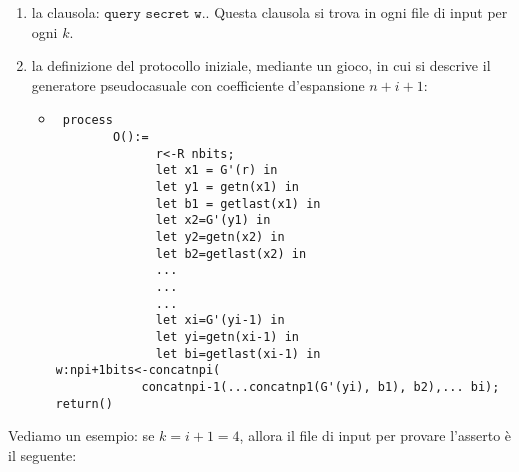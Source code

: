 \documentclass[a4paper,openright,twoside,12pt]{report}
\begin{document}
\begin{enumerate}
\item la clausola: $\texttt{query secret w.}$. Questa clausola si trova in ogni file di input per ogni $k$.
\item la definizione del protocollo iniziale, mediante un gioco, in cui si descrive il generatore pseudocasuale con coefficiente d'espansione $n+i+1$:
\begin{itemize}
 \item \begin{verbatim}
 process
        O():=
              r<-R nbits;
              let x1 = G'(r) in
              let y1 = getn(x1) in
              let b1 = getlast(x1) in
              let x2=G'(y1) in
              let y2=getn(x2) in
              let b2=getlast(x2) in
              ...
              ...
              ...
              let xi=G'(yi-1) in
              let yi=getn(xi-1) in
              let bi=getlast(xi-1) in
w:npi+1bits<-concatnpi(
            concatnpi-1(...concatnp1(G'(yi), b1), b2),... bi);
return()
\end{verbatim}
\end{itemize}
\end{enumerate}

Vediamo un esempio: se $k=i+1=4$, allora il file di input per provare l'asserto \`e il seguente:
\end{document}
